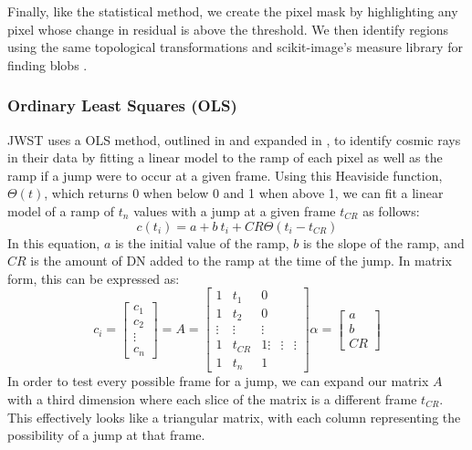 Finally, like the statistical method, we create the pixel mask by highlighting any pixel whose change in residual is above the threshold.
We then identify regions using the same topological transformations and scikit-image's measure library for finding blobs \parencite{scikit-image}.

\subsubsection{Ordinary Least Squares (OLS)}
JWST uses a OLS method, outlined in \cite{robberto2014generalized} and expanded in \cite{robberto2015cr}, to identify cosmic rays in their data by fitting a linear model to the ramp of each pixel as well as the ramp if a jump were to occur at a given frame.
Using this Heaviside function, $\Theta(t)$, which returns 0 when below 0 and 1 when above 1, we can fit a linear model of a ramp of $t_n$ values with a jump at a given frame $t_{CR}$ as follows:
\begin{equation}
    c(t_i) = a + b\ t_i + CR \Theta(t_i - t_{CR})
\end{equation}
In this equation, $a$ is the initial value of the ramp, $b$ is the slope of the ramp, and $CR$ is the amount of DN added to the ramp at the time of the jump.
In matrix form, this can be expressed as:
\begin{equation}
    c_i = \begin{bmatrix}
        c_1 \\
        c_2 \\
        \vdots \\
        c_n
    \end{bmatrix} =
    A = \begin{bmatrix}
        1 & t_1 & 0 \\
        1 & t_2 & 0 \\
        \vdots & \vdots & \vdots \\
        1 & t_{CR} & 1
        \vdots & \vdots & \vdots \\
        1 & t_n & 1
    \end{bmatrix}
    \alpha = \begin{bmatrix}
        a \\ b \\ CR
    \end{bmatrix}
\end{equation}
In order to test every possible frame for a jump, we can expand our matrix $A$ with a third dimension where each slice of the matrix is a different frame $t_{CR}$.
This effectively looks like a triangular matrix, with each column representing the possibility of a jump at that frame.

